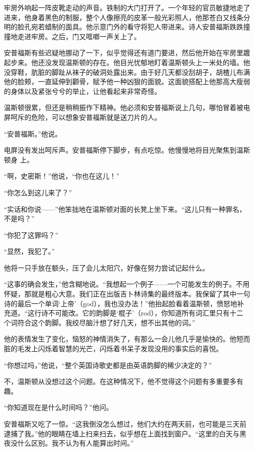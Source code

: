 牢房外响起一阵皮靴走动的声音。铁制的大门打开了。一个年轻的官员敏捷地走了进来，他身着黑色的制服，整个人像擦亮的皮革一般光彩照人，他那苍白又线条分明的脸孔宛若蜡制的面具。他示意门外的看守将犯人带进来。诗人安普福斯跌跌撞撞地走进牢房。之后，门又哐啷一声关上了。

安普福斯有些迟疑地挪动了一下，似乎觉得还有道门要进，然后他开始在牢房里踱起步来。他还没发现温斯顿的存在。他目光忧郁地盯着温斯顿头上一米处的墙。他没穿鞋，肮脏的脚趾从袜子的破洞处露出来。由于好几天都没刮胡子，胡楂儿布满他的脸颊，一直延伸到颧骨，赋予他一种凶狠的面貌。这面貌搭配上他那高大瘦弱的身体以及紧张兮兮的举止，让他看起来非常奇怪。

温斯顿很累，但还是稍稍振作下精神。他必须和安普福斯说上几句，哪怕冒着被电屏呵斥的危险，可以想象安普福斯就是送刀片的人。

``安普福斯。''他说。

电屏没有发出呵斥声。安普福斯停下脚步，有点吃惊。他慢慢地将目光聚焦到温斯顿身
上。

``啊，史密斯！''他说，``你也在这儿！''

``你怎么到这儿来了？''

``实话和你说——''他笨拙地在温斯顿对面的长凳上坐下来。``这儿只有一种罪名，不是吗？''

``你犯了这罪吗？''

``显然，我犯了。''

他将一只手放在额头，压了会儿太阳穴，好像在努力尝试记起什么。

``这事的确会发生，''他含糊地说。``我想起一个例子——一个可能发生的例子。不用怀疑，那就是粗心大意。我们正在出版吉卜林诗集的最终版本。我保留了其中一句诗的最后一个单词`上帝'（god），我也没办法！''他抬起脸看着温斯顿，愤怒地补充道。``这行诗不可能改。它的韵脚是`棍子'（rod），你知道所有词汇里只有十二个词符合这个韵脚。我绞尽脑汁想了好几天，想不出其他的词。''

他的表情发生了变化，恼怒的神情消失了，有那么一会儿他几乎是愉快的。他短而脏的毛发上闪烁着智慧的光芒，闪烁着书呆子发现没用的事实后的喜悦。

``你想过吗，''他说，``整个英国诗歌史都是由英语韵脚的稀少决定的？''

不，温斯顿从没想过这个问题。在这种情况下，他不觉得这个问题有多重要多有趣。

``你知道现在是什么时间吗？''他问。

安普福斯又吃了一惊。``这我倒没怎么想过，他们大约在两天前，也可能是三天前逮捕了我。''他的眼睛在墙上扫来扫去，似乎想在上面找到窗户。``这里的白天与黑夜没什么区别。我不认为有人能算出时间。''

